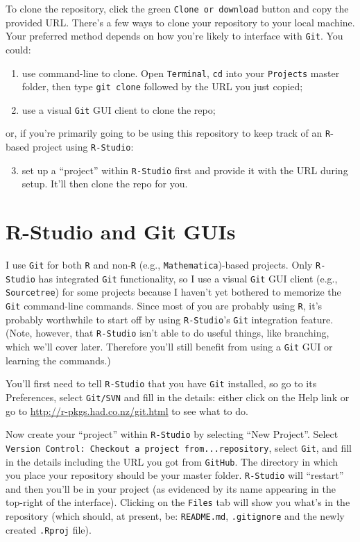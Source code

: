 \documentclass[12pt,letterpaper]{article}
\begin{document}
To clone the repository, click the green \texttt{Clone or download} button and copy the provided URL.
There's a few ways to clone your repository to your local machine.
Your preferred method depends on how you're likely to interface with \texttt{Git}.
You could:
\begin{enumerate}
	\item use command-line to clone.  Open \texttt{Terminal}, \texttt{cd} into your \texttt{Projects} master folder, then type \texttt{git clone} followed by the URL you just copied;
	\item use a visual \texttt{Git} GUI client to clone the repo;
\end{enumerate}
or, if you're primarily going to be using this repository to keep track of an \texttt{R}-based project using \texttt{R-Studio}:
\begin{enumerate}
  \setcounter{enumi}{2}
	\item set up a ``project'' within \texttt{R-Studio} first and provide it with the URL during setup.  It'll then clone the repo for you.
\end{enumerate}

\section{R-Studio and Git GUIs}
I use \texttt{Git} for both \texttt{R} and non-\texttt{R} (e.g.,  \texttt{Mathematica})-based projects.
Only  \texttt{R-Studio} has integrated  \texttt{Git} functionality, so I use a visual  \texttt{Git} GUI client (e.g., \texttt{Sourcetree}) for some projects because I haven't yet bothered to memorize the  \texttt{Git} command-line commands.
Since most of you are probably using \texttt{R}, it's probably worthwhile to start 
off by using \texttt{R-Studio}'s \texttt{Git} integration feature.
(Note, however, that \texttt{R-Studio} isn't able to do useful things, like 
branching, which we'll cover later.  Therefore you'll still benefit from using a 
\texttt{Git} GUI or learning the commands.)

You'll first need to tell \texttt{R-Studio} that you have \texttt{Git} installed, so go to its Preferences, select \texttt{Git/SVN} and fill in the details: either click on the Help link or go to
\url{http://r-pkgs.had.co.nz/git.html} to see what to do.

Now create your ``project'' within  \texttt{R-Studio} by selecting ``New Project''.
Select \texttt{Version Control: Checkout a project from...repository}, select 
\texttt{Git}, and fill in the details including the URL you got from \texttt{GitHub}.
The directory in which you place your repository should be your master folder.
\texttt{R-Studio} will ``restart'' and then you'll be in your project (as evidenced by its name appearing in the top-right of the interface).
Clicking on the \texttt{Files} tab will show you what's in the repository (which should, at present, be: \texttt{README.md}, \texttt{.gitignore} and the newly created \texttt{.Rproj} file).
\end{document}
